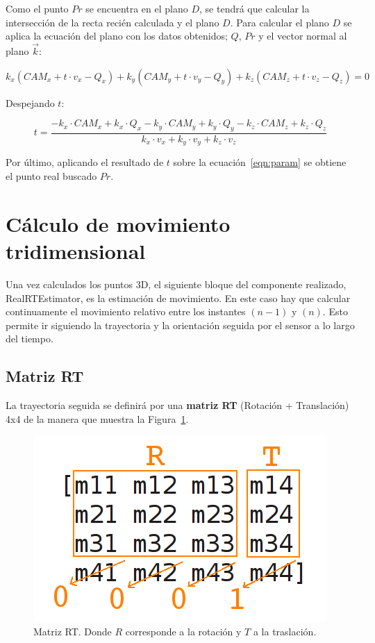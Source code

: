 Como el punto $Pr$ se encuentra en el plano $D$, se tendrá que calcular la intersección de la recta recién calculada y el plano $D$. Para calcular el plano $D$ se aplica la ecuación del plano con los datos obtenidos; $Q$, $Pr$ y el vector normal al plano $\vec{k}$:

\begin{equation}
k_{x}(CAM_{x}+t\cdot v_{x}-Q_{x})+k_{y}(CAM_{y}+t\cdot v_{y}-Q_{y})+k_{z}(CAM_{z}+t\cdot v_{z}-Q_{z})=0
\end{equation}

Despejando $t$:

\begin{equation}
t=\frac{-k_{x}\cdot CAM_{x}+k_{x}\cdot Q_{x}-k_{y}\cdot CAM_{y}+k_{y}\cdot Q_{y}-k_{z}\cdot CAM_{z}+k_{z}\cdot Q_{z}}{k_{x}\cdot v_{x}+k_{y}\cdot v_{y}+k_{z}\cdot v_{z}}
\end{equation}

Por último, aplicando el resultado de $t$ sobre la ecuación~\ref{eqn:param} se obtiene el punto real buscado $Pr$.

\section{Cálculo de movimiento tridimensional}

Una vez calculados los puntos 3D, el siguiente bloque del componente realizado, RealRTEstimator, es la estimación de movimiento. En este caso hay que calcular continuamente el movimiento relativo entre los instantes $(n-1)$ y $(n)$. Esto permite ir siguiendo la trayectoria y la orientación seguida por el sensor a lo largo del tiempo.

\subsection{Matriz RT}

La trayectoria seguida se definirá por una \textbf{matriz RT} (Rotación + Translación) 4x4 de la manera que muestra la Figura~\ref{fig:matrixRT}.

\begin{figure}[th]
\centering
\includegraphics[scale=0.5]{Figures/matrixRT.png}
\decoRule
\caption[Matriz RT]{Matriz RT. Donde $R$ corresponde a la rotación y $T$ a la traslación.}
\label{fig:matrixRT}
\end{figure}

